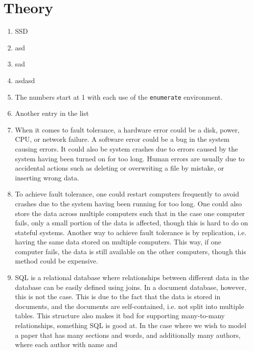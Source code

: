 \section{Theory}

\begin{enumerate}
    \item 
        SSD 
    \item 
        asd
    \item 
        sad
    \item 
        asdasd
    \item 
        The numbers start at 1 with each use of the \texttt{enumerate} environment.
    \item 
        Another entry in the list
    \item 
        When it comes to fault tolerance, a hardware error could be a disk, 
        power, CPU, or network failure. A software error could be a bug in the
        system causing errors. It could also be system crashes due to errors 
        caused by the system having been turned on for too long. Human errors 
        are usually due to accidental actions such as deleting or overwriting a 
        file by mistake, or inserting wrong data. 
    \item 
        To achieve fault tolerance, one could restart computers frequently to
        avoid crashes due to the system having been running for too long. One 
        could also store the data across multiple computers such that in the 
        case one computer fails, only a small portion of the data is affected, 
        though this is hard to do on stateful systems. Another way to achieve
        fault tolerance is by replication, i.e. having the same data stored on
        multiple computers. This way, if one computer fails, the data is still
        available on the other computers, though this method could be expensive.
    \item
        SQL is a relational database where relationships between different data
        in the database can be easily defined using joins. In a document 
        database, however, this is not the case. This is due to the fact that 
        the data is stored in documents, and the documents are self-contained,
        i.e. not split into multiple tables. This structure also makes it bad 
        for supporting many-to-many relationships, something SQL is good at. In
        the case where we wish to model a paper that has many sections and 
        words, and additionally many authors, where each author with name and 

\end{enumerate}
